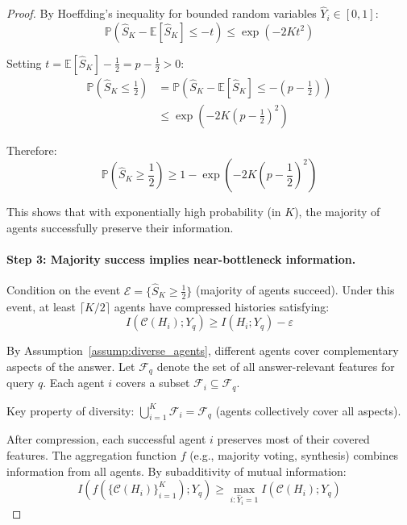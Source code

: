 \documentclass{article}
\theoremstyle{plain}
\theoremstyle{definition}
\theoremstyle{remark}
\begin{document}
\begin{proof}
By Hoeffding's inequality for bounded random variables $\hat{Y}_i \in [0, 1]$:
\begin{equation}
\mathbb{P}\left(\hat{S}_K - \mathbb{E}[\hat{S}_K] \leq -t\right) \leq \exp(-2Kt^2)
\end{equation}

Setting $t = \mathbb{E}[\hat{S}_K] - \frac{1}{2} = p - \frac{1}{2} > 0$:
\begin{align}
\mathbb{P}\left(\hat{S}_K \leq \frac{1}{2}\right) &= \mathbb{P}\left(\hat{S}_K - \mathbb{E}[\hat{S}_K] \leq -\left(p - \frac{1}{2}\right)\right) \\
&\leq \exp\left(-2K\left(p - \frac{1}{2}\right)^2\right)
\end{align}

Therefore:
\begin{equation}
\mathbb{P}\left(\hat{S}_K \geq \frac{1}{2}\right) \geq 1 - \exp\left(-2K\left(p - \frac{1}{2}\right)^2\right)
\end{equation}

This shows that with exponentially high probability (in $K$), the majority of agents successfully preserve their information.

\paragraph{Step 3: Majority success implies near-bottleneck information.}

Condition on the event $\mathcal{E} = \{\hat{S}_K \geq \frac{1}{2}\}$ (majority of agents succeed). Under this event, at least $\lceil K/2 \rceil$ agents have compressed histories satisfying:
\begin{equation}
I(\mathcal{C}(H_i); Y_q) \geq I(H_i; Y_q) - \varepsilon
\end{equation}

By Assumption~\ref{assump:diverse_agents}, different agents cover complementary aspects of the answer. Let $\mathcal{F}_q$ denote the set of all answer-relevant features for query $q$. Each agent $i$ covers a subset $\mathcal{F}_i \subseteq \mathcal{F}_q$.

Key property of diversity: $\bigcup_{i=1}^K \mathcal{F}_i = \mathcal{F}_q$ (agents collectively cover all aspects).

After compression, each successful agent $i$ preserves most of their covered features. The aggregation function $f$ (e.g., majority voting, synthesis) combines information from all agents. By subadditivity of mutual information:
\begin{equation}
I(f(\{\mathcal{C}(H_i)\}_{i=1}^K); Y_q) \geq \max_{i : \hat{Y}_i=1} I(\mathcal{C}(H_i); Y_q)
\end{equation}


\end{proof}
\end{document}
